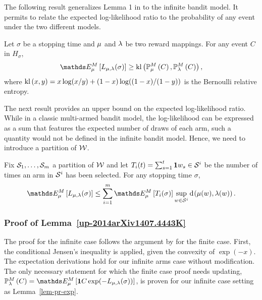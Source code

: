The following result generalizes Lemma 1 in \cite{JMLR15} to the infinite
bandit model. It permits to relate the expected log-likelihood ratio to the
probability of any event under the two different models.

\begin{lemma}\label{up-2014arXiv1407.4443K}
\label{lem-log-lik}
Let $\sigma$ be a stopping time and $\mu$ and $\lambda$ be two reward mappings.
For any event $C$ in $H_\sigma$,
\begin{align*}
\ETrueModel{ L_{\ArmMean,\ArmMeanAlt}(\sigma) }
	\ge \BernKL{\PrTrueModel{C}}{\PrAltModel{C}},
\end{align*}
where $\operatorname{kl}\left( x, y \right)=x\log(x/y) + (1-x)\log((1-x)/(1-y))$ is the Bernoulli relative
entropy.
\end{lemma}

The next result provides an upper bound on the expected log-likelihood ratio.
While in a classic multi-armed bandit model, the log-likelihood can be
expressed as a sum that features the expected number of draws of each arm, such
a quantity would not be defined in the infinite bandit model. Hence, we need to
introduce a partition of $\mathcal{W}$.

\begin{lemma}\label{main-lb-lemma}
Fix $\mathcal{S}_{1},\dots,\mathcal{S}_{m}$ a partition of $\mathcal{W}$ and let
$T_i(t) = \sum_{s=1}^t\mathbf{1}{w_s \in \mathcal{S}^{i}}$
be the number of times an arm in $\mathcal{S}^{i}$ has been selected.
For any stopping time $\sigma$,
\begin{align*}
\ETrueModel{ L_{\ArmMean,\ArmMeanAlt}(\sigma) }
\leq \sum_{i=1}^m \ETrueModel{ T_i(\sigma) } \sup_{\arm \in \ArmGrp{i}} \ArmKL{\ArmMean(\arm)}{\ArmMeanAlt(\arm)}.
\end{align*}
\end{lemma}



\subsubsection{Proof of Lemma~\ref{up-2014arXiv1407.4443K}}

The proof for the infinite case follows the argument by \cite{JMLR15} for the
finite case. First, the conditional Jensen's inequality is applied, given the
convexity of
$\exp(-x)$.
The expectation derivations hold for our infinite arms case without
modification.
The only necessary statement for which the finite case proof needs updating,
$\PrAltModel{C} = \ETrueModel{ \1{C} \exp(-L_{\ArmMean,\ArmMeanAlt}(\sigma)) }$,
is proven for our infinite case setting as Lemma~\ref{lem-pr-exp}.


